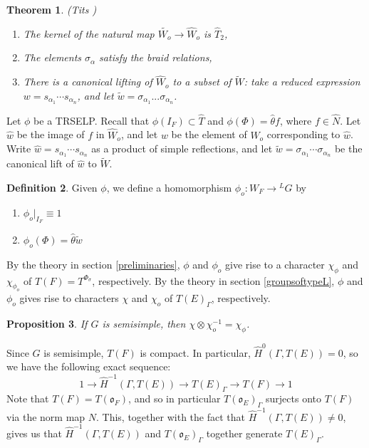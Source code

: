 \documentclass[11pt]{amsart}
\theoremstyle{plain}
\newtheorem{theorem}{Theorem}[section]
\newtheorem{proposition}[theorem]{Proposition}
\theoremstyle{definition}
\newtheorem{definition}[theorem]{Definition}
\begin{document}
\begin{theorem}{(Tits \cite{tits})}
\begin{enumerate}

\item The kernel of the natural map $\widetilde{W_o} \rightarrow \hat{W}_o$
  is $\hat{T}_2$,
\item The elements $\sigma_{\alpha}$ satisfy the braid relations,
\item There is a canonical lifting of $\hat{W}_o$ to a subset of
  $\widetilde{W}$: take a reduced expression $w = s_{\alpha_1} \cdots s_{\alpha_n}$,
  and let $\tilde{w} = \sigma_{\alpha_1} ... \sigma_{\alpha_n}$.
\end{enumerate}
\end{theorem}

Let $\phi$ be a TRSELP.  Recall that $\phi(I_F) \subset \hat{T}$ and
$\phi(\Phi) = \hat{\theta} f$, where $f \in \hat{N}$.  Let $\hat{w}$
be the image of $f$ in $\hat{W}_o$, and let $w$ be the element of
$W_o$ corresponding to $\hat{w}$.  Write $\hat{w} = s_{\alpha_1} \cdots s_{\alpha_n}$
as a product of simple reflections, and let
$\tilde{w} = \sigma_{\alpha_1} \cdots \sigma_{\alpha_n}$ be the
canonical lift of $\hat{w}$ to $\widetilde{W}$.

\begin{definition}
Given $\phi$, we define a homomorphism $\phi_o : W_F \rightarrow {}^L G$ by
\begin{enumerate}
\item $\phi_o|_{I_F} \equiv 1$
\item $\phi_o(\Phi) = \hat{\theta} \tilde{w}$
\end{enumerate}
\end{definition}

By the theory in section \ref{preliminaries}, $\phi$ and $\phi_o$ give
rise to a character $\chi_{\phi}$ and $\chi_{\phi_o}$ of
$T(F) = T^{\Phi_{\sigma}}$, respectively.  By the theory in section
\ref{groupsoftypeL}, $\phi$ and $\phi_o$ gives rise to characters
$\chi$ and $\chi_o$ of $T(E)_{\Gamma}$, respectively.

\begin{proposition}
If $G$ is semisimple, then $\chi \otimes \chi_o^{-1} = \chi_{\phi}$.
\end{proposition}

\proof
Since $G$ is semisimple, $T(F)$ is compact.  In particular,
$\hat{H}^0(\Gamma, T(E)) = 0$, so we have the following exact
sequence:
$$1 \rightarrow \hat{H}^{-1}(\Gamma, T(E)) \rightarrow T(E)_{\Gamma} \rightarrow T(F) \rightarrow 1$$
Note that $T(F) = T(\mathfrak{o}_F)$, and so in particular
$T(\mathfrak{o}_E)_{\Gamma}$ surjects onto $T(F)$ via the norm map
$N$.  This, together with the fact that $\hat{H}^{-1}(\Gamma, T(E)) \neq 0$,
gives us that $\hat{H}^{-1}(\Gamma,T(E))$ and
$T(\mathfrak{o}_E)_{\Gamma}$ together generate $T(E)_{\Gamma}$.
\end{document}
